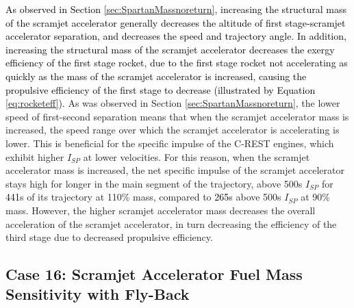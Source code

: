 \textcolor{black}{
As observed in Section \ref{sec:SpartanMassnoreturn}, increasing the structural mass of the scramjet accelerator generally decreases the altitude of first stage-scramjet accelerator separation, and decreases the speed and trajectory angle. 
In addition, increasing the structural mass of the scramjet accelerator decreases the exergy efficiency of the first stage rocket, due to the first stage rocket not accelerating as quickly as the mass of the scramjet accelerator is increased, causing the propulsive efficiency of the first stage to decrease (illustrated by Equation \ref{eq:rocketeff}).}
 As was observed in Section \ref{sec:SpartanMassnoreturn}, the lower speed of first-second separation means that when the scramjet accelerator mass is increased, the speed range over which the scramjet accelerator is accelerating is lower. This is beneficial for the specific impulse of the C-REST engines, which exhibit higher $I_{SP}$ at lower velocities. For this reason, when the scramjet accelerator mass is increased, the net specific impulse of the scramjet accelerator stays high for longer in the main segment of the trajectory, above 500s $I_{SP}$ for \textcolor{black}{441}s of its trajectory at 110\% mass, compared to \textcolor{black}{265}s above 500s $I_{SP}$ at 90\% mass. 
However, the higher scramjet accelerator mass decreases the overall acceleration of the scramjet accelerator, in turn decreasing the efficiency of the third stage due to decreased propulsive efficiency.


\subsection{Case 16: Scramjet Accelerator Fuel Mass Sensitivity with Fly-Back}

